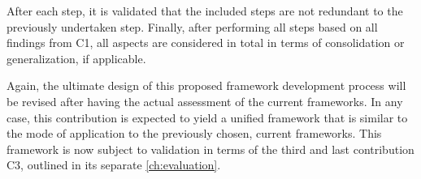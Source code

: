 After each step, it is validated that the included steps are not redundant to the previously undertaken step. Finally, after performing all steps based on all findings from C1, all aspects are considered in total in terms of consolidation or generalization, if applicable.

Again, the ultimate design of this proposed framework development process will be revised after having the actual assessment of the current frameworks. In any case, this contribution is expected to yield a unified framework that is similar to the mode of application to the previously chosen, current frameworks. This framework is now subject to validation in terms of the third and last contribution C3, outlined in its separate \autoref{ch:evaluation}.

